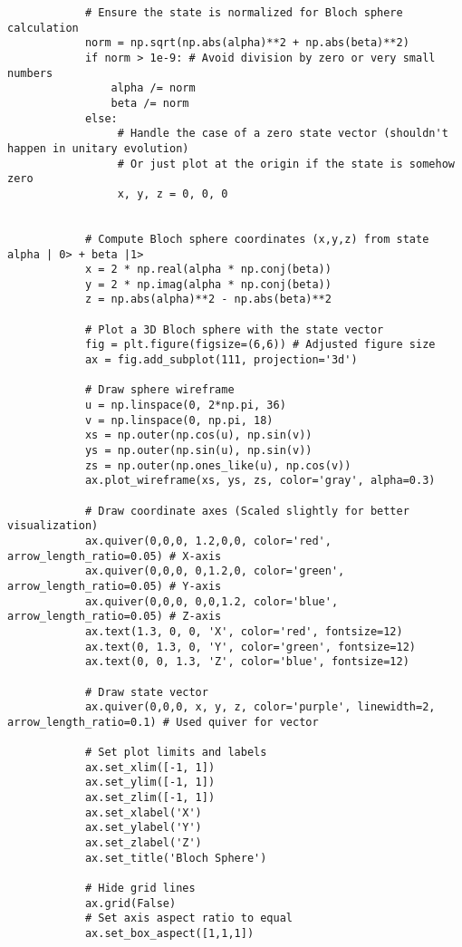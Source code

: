 \documentclass{beamer}
\begin{document}
\begin{frame}
\begin{verbatim}
            # Ensure the state is normalized for Bloch sphere calculation
            norm = np.sqrt(np.abs(alpha)**2 + np.abs(beta)**2)
            if norm > 1e-9: # Avoid division by zero or very small numbers
                alpha /= norm
                beta /= norm
            else:
                 # Handle the case of a zero state vector (shouldn't happen in unitary evolution)
                 # Or just plot at the origin if the state is somehow zero
                 x, y, z = 0, 0, 0


            # Compute Bloch sphere coordinates (x,y,z) from state alpha | 0> + beta |1>
            x = 2 * np.real(alpha * np.conj(beta))
            y = 2 * np.imag(alpha * np.conj(beta))
            z = np.abs(alpha)**2 - np.abs(beta)**2

            # Plot a 3D Bloch sphere with the state vector
            fig = plt.figure(figsize=(6,6)) # Adjusted figure size
            ax = fig.add_subplot(111, projection='3d')

            # Draw sphere wireframe
            u = np.linspace(0, 2*np.pi, 36)
            v = np.linspace(0, np.pi, 18)
            xs = np.outer(np.cos(u), np.sin(v))
            ys = np.outer(np.sin(u), np.sin(v))
            zs = np.outer(np.ones_like(u), np.cos(v))
            ax.plot_wireframe(xs, ys, zs, color='gray', alpha=0.3)

            # Draw coordinate axes (Scaled slightly for better visualization)
            ax.quiver(0,0,0, 1.2,0,0, color='red', arrow_length_ratio=0.05) # X-axis
            ax.quiver(0,0,0, 0,1.2,0, color='green', arrow_length_ratio=0.05) # Y-axis
            ax.quiver(0,0,0, 0,0,1.2, color='blue', arrow_length_ratio=0.05) # Z-axis
            ax.text(1.3, 0, 0, 'X', color='red', fontsize=12)
            ax.text(0, 1.3, 0, 'Y', color='green', fontsize=12)
            ax.text(0, 0, 1.3, 'Z', color='blue', fontsize=12)

            # Draw state vector
            ax.quiver(0,0,0, x, y, z, color='purple', linewidth=2, arrow_length_ratio=0.1) # Used quiver for vector

            # Set plot limits and labels
            ax.set_xlim([-1, 1])
            ax.set_ylim([-1, 1])
            ax.set_zlim([-1, 1])
            ax.set_xlabel('X')
            ax.set_ylabel('Y')
            ax.set_zlabel('Z')
            ax.set_title('Bloch Sphere')

            # Hide grid lines
            ax.grid(False)
            # Set axis aspect ratio to equal
            ax.set_box_aspect([1,1,1])


\end{verbatim}
\end{frame}
\end{document}
